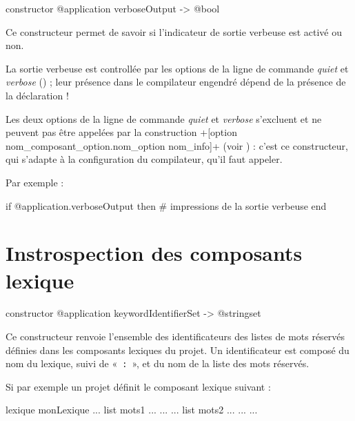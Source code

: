 \begin{galgasbox}
constructor @application verboseOutput -> @bool
\end{galgasbox}

Ce constructeur permet de savoir si l'indicateur de sortie verbeuse est activé ou non.

La sortie verbeuse est controllée par les options de la ligne de commande \emph{quiet} et \emph{verbose} () ; leur présence dans le compilateur engendré dépend de la présence de la déclaration \ggs!%

Les deux options de la ligne de commande \emph{quiet} et \emph{verbose} s'excluent et ne peuvent pas être appelées par la construction \ggs+[option nom_composant_option.nom_option nom_info]+ (voir ) : c'est ce constructeur, qui s'adapte à la configuration du compilateur, qu'il faut appeler.

Par exemple :
\begin{galgas}
if @application.verboseOutput then
  # impressions de la sortie verbeuse
end
\end{galgas}














\section{Instrospection des composants lexique}


\begin{galgasbox}
constructor @application keywordIdentifierSet -> @stringset
\end{galgasbox}


Ce constructeur renvoie l'ensemble des identificateurs des listes de mots réservés définies dans les composants lexiques du projet. Un identificateur est composé du nom du lexique, suivi de «~\texttt{:}~», et du nom de la liste des mots réservés.


Si par exemple un projet définit le composant lexique suivant :

\begin{galgas}
lexique monLexique {
  ...
  list mots1 ... { ... }
  ...
  list mots2 ... { ... }
  ...
}
\end{galgas}

